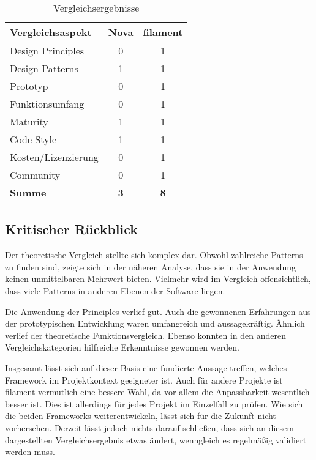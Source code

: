 \begin{table}[h!]
    \centering
    \caption{Vergleichsergebnisse}
    \label{tab:vergleichsergebnisse}
    \begin{tabular}{|l|c|c|}
        \hline
        \textbf{Vergleichsaspekt} & \textbf{Nova} & \textbf{filament} \\ \hline
        Design Principles         & 0             & 1                 \\ \hline
        Design Patterns           & 1             & 1                 \\ \hline
        Prototyp                  & 0             & 1                 \\ \hline
        Funktionsumfang           & 0             & 1                 \\ \hline
        Maturity                  & 1             & 1                 \\ \hline
        Code Style                & 1             & 1                 \\ \hline
        Kosten/Lizenzierung       & 0             & 1                 \\ \hline
        Community                 & 0             & 1                 \\ \hline
        \textbf{Summe}            & \textbf{3}    & \textbf{8}        \\ \hline
    \end{tabular}
\end{table}

\newpage

\subsection{Kritischer Rückblick}
Der theoretische Vergleich stellte sich komplex dar.
Obwohl zahlreiche Patterns zu finden sind, zeigte sich in der näheren Analyse, dass sie in der Anwendung keinen unmittelbaren Mehrwert bieten.
Vielmehr wird im Vergleich offensichtlich, dass viele Patterns in anderen Ebenen der Software liegen.

Die Anwendung der Principles verlief gut.
Auch die gewonnenen Erfahrungen aus der prototypischen Entwicklung waren umfangreich und aussagekräftig.
Ähnlich verlief der theoretische Funktionsvergleich.
Ebenso konnten in den anderen Vergleichskategorien hilfreiche Erkenntnisse gewonnen werden.

Insgesamt lässt sich auf dieser Basis eine fundierte Aussage treffen, welches Framework im Projektkontext geeigneter ist.
Auch für andere Projekte ist filament vermutlich eine bessere Wahl, da vor allem die Anpassbarkeit wesentlich besser ist.
Dies ist allerdings für jedes Projekt im Einzelfall zu prüfen.
Wie sich die beiden Frameworks weiterentwickeln, lässt sich für die Zukunft nicht vorhersehen.
Derzeit lässt jedoch nichts darauf schließen, dass sich an diesem dargestellten Vergleichsergebnis etwas ändert, wenngleich es regelmäßig validiert werden muss.

